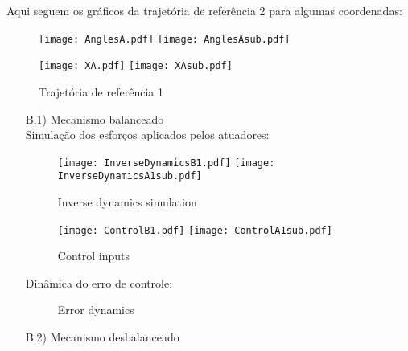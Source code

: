 \begin{itemize}
Aqui seguem os gr\'aficos da trajet\'oria de refer\^encia 2 para algumas coordenadas:

\begin{figure}[ht]
\centering
\begin{minipage}[b]{0.45\linewidth}
\texttt{[image: AnglesA.pdf]}
\texttt{[image: AnglesAsub.pdf]}
\label{fig:AnglesB}
\end{minipage}
\quad
\begin{minipage}[b]{0.45\linewidth}
\texttt{[image: XA.pdf]}
\texttt{[image: XAsub.pdf]}
\label{fig:XB}
\end{minipage}
\caption{Trajet\'oria de refer\^encia 1}
\end{figure}

\begin{itemize}
\item[B.1)] Mecanismo balanceado \\

Simula\c{c}\~ao dos esfor\c{c}os aplicados pelos atuadores:

\begin{figure}[H]
\centering
\begin{minipage}[b]{0.45\linewidth}
\texttt{[image: InverseDynamicsB1.pdf]}
\texttt{[image: InverseDynamicsA1sub.pdf]}
\label{fig:InverseDynamicsB1}
\caption{Inverse dynamics simulation}
\end{minipage}
\quad
\begin{minipage}[b]{0.45\linewidth}
\texttt{[image: ControlB1.pdf]}
\texttt{[image: ControlA1sub.pdf]}
\label{fig:ControlB1}
\caption{Control inputs}
\end{minipage}
\end{figure}

Din\^amica do erro de controle:

\begin{figure}[H]
\centering
{}
\quad
{}
%
\caption{Error dynamics}
\label{fig:figure}
\end{figure}

\item[B.2)] Mecanismo desbalanceado \\


\end{itemize}
\end{itemize}
